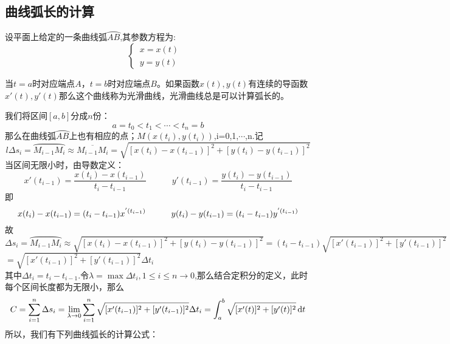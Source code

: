 \subsection{曲线弧长的计算}
设平面上给定的一条曲线弧$\wideparen{AB}$,其参数方程为:
\begin{equation}
	\begin{cases}
		\, x=x(t)\\
		 \, y=y(t)&
	\end{cases}
\end{equation}
\par 当$t=a$时对应端点$A$，$t=b$时对应端点$B$。如果函数$x(t),y(t)$有连续的导函数$x'(t),y'(t)$那么这个曲线称为光滑曲线，光滑曲线总是可以计算弧长的。
\par 我们将区间$[a,b]$分成$n$份：
\begin{equation}
	\nonumber
	a=t_0<t_1<\cdots<t_n=b
\end{equation}
那么在曲线弧$\wideparen{AB}$上也有相应的点；$M(x(t_i),y(t_i))$,i=0,1,$\cdots$,n.记
\begin{equation}l
	\Delta s_i=\wideparen{M_{i-1}M_i}\approx\overline{M_{i-1}M_i} =\sqrt{[x(t_i)-x(t_{i-1})]^2+[y(t_i)-y(t_{i-1})]^2}
\end{equation}
当区间无限小时，由导数定义：
\begin{equation}
	x'(t_{i-1})=\frac{x(t_i)-x(t_{i-1})}{t_i-t_{i-1}}\hspace{3em} y'(t_{i-1})=\frac{y(t_i)-y(t_{i-1})}{t_i-t_{i-1}}
\end{equation}
即
\begin{equation}
	x(t_i)-x(t_{i-1})=(t_i-t_{i-1})x^{'(t_{i-1})} \hspace*{3em}	y(t_i)-y(t_{i-1})=(t_i-t_{i-1})y^{'(t_{i-1})}
\end{equation}
故\\
$\Delta s_i=\wideparen{M_{i-1}M_i}\approx \sqrt{[x(t_i)-x(t_{i-1})]^2+[y(t_i)-y(t_{i-1})]^2}=(t_i-t_{i-1})\sqrt{[x'(t_{i-1})]^2+[y'(t_{i-1})]^2}$\\
\hspace*{5.8em}$=\sqrt{[x'(t_{i-1})]^2+[y'(t_{i-1})]^2}\Delta t_i$\\
其中$\Delta t_i=t_i-t_{i-1}$.令$\lambda=\max{\Delta t_i,1\leq i\leq n}\to0$,那么结合定积分的定义，此时每个区间长度都为无限小，那么
\begin{equation}
	C=\sum_{i=1}^{n}\Delta s_i=\lim\limits_{\lambda\to 0}\sum_{i=1}^{n}\sqrt{[x'(t_{i-1})]^2+[y'(t_{i-1})]^2}\Delta t_i=\int_{a}^{b}\sqrt{[x'(t)]^2+[y'(t)]^2}\,{\rm{d}} t
\end{equation}
所以，我们有下列曲线弧长的计算公式：
